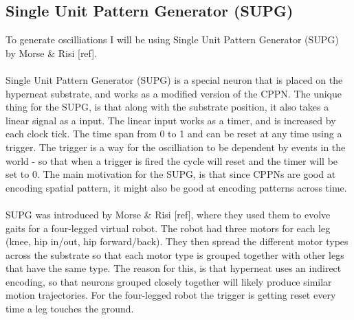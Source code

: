 \documentclass[11pt, a4paper]{article}
\begin{document}
\subsection{Single Unit Pattern Generator (SUPG)}
To generate oscilliations I will be using Single Unit Pattern Generator (SUPG) by Morse \& Risi [ref].
\\
\\
Single Unit Pattern Generator (SUPG) is a special neuron that is placed on the hyperneat substrate, and works as a modified version of the CPPN. The unique thing for the SUPG, is that along with the substrate position, it also takes a linear signal as a input. The linear input works as a timer, and is increased by each clock tick. The time span from 0 to 1 and can be reset at any time using a trigger. The trigger is a way for the oscilliation to be dependent by events in the world - so that when a trigger is fired the cycle will reset and the timer will be set to 0. The main motivation for the SUPG, is that since CPPNs are good at encoding spatial pattern, it might also be good at encoding patterns across time.
\\
\\
SUPG was introduced by Morse \& Risi [ref], where they used them to evolve gaits for a four-legged virtual robot. The robot had three motors for each leg (knee, hip in/out, hip forward/back). They then spread the different motor types across the substrate so that each motor type is grouped together with other legs that have the same type. The reason for this, is that hyperneat uses an indirect encoding, so that neurons grouped closely together will likely produce similar motion trajectories. For the four-legged robot the trigger is getting reset every time a leg touches the ground.
\end{document}

